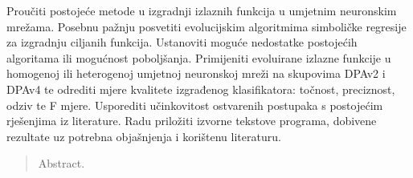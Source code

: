 \documentclass[times, utf8, diplomski]{fer}
\begin{document}
\begin{sazetak}
Proučiti postojeće metode u izgradnji izlaznih funkcija u umjetnim neuronskim mrežama. Posebnu pažnju posvetiti evolucijskim algoritmima simboličke regresije za izgradnju ciljanih funkcija. Ustanoviti moguće nedostatke postojećih algoritama ili mogućnost poboljšanja. Primijeniti evoluirane izlazne funkcije u homogenoj ili heterogenoj umjetnoj neuronskoj mreži na skupovima DPAv2 i DPAv4 te odrediti mjere kvalitete izgrađenog klasifikatora: točnost, preciznost, odziv te F mjere. Usporediti učinkovitost ostvarenih postupaka s postojećim rješenjima iz literature. Radu priložiti izvorne tekstove programa, dobivene rezultate uz potrebna objašnjenja i korištenu literaturu.

\end{sazetak}

\begin{abstract}
Abstract.

\end{abstract}
\end{document}
